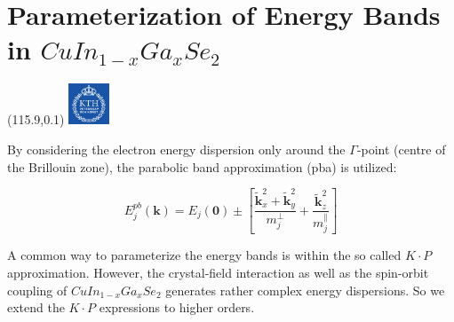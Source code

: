 \documentclass[]{beamer}
\newcommand{\MyLogo}{%
\begin{textblock}{14}(115.9,0.1)
  \includegraphics[width=1.22cm]{kth_rgb}
 \end{textblock}
}
\begin{document}
\section{Parameterization of Energy Bands in $CuIn_{1-x}Ga_{x}Se_2$} 
\begin{frame}
\MyLogo

By considering the electron energy dispersion only around the $\Gamma$-point (centre of the Brillouin zone),
the parabolic band approximation (pba) is utilized:


\begin{equation}\label{parabolic}
E_{j}^{pb}(\textbf{k}) = E_{j}(\textbf{0}) \pm \left[ \frac{\widetilde{\textbf{k}}_{x}^{2}+\widetilde{ \textbf{k}}_{y}^{2}}{m_{j}^{\perp}} +  \frac{\widetilde{\textbf{k}}_{z}^{2}}{m_{j}^{\parallel}} \right]
\end{equation}


A common way to parameterize the energy bands is within the so called $K \cdot P$ approximation. However, 
the crystal-field interaction as well as the spin-orbit coupling of $CuIn_{1-x}Ga_{x}Se_2$ generates rather complex energy dispersions. 
So we extend the $K \cdot P$ expressions to higher orders.
\end{frame}
\end{document}

